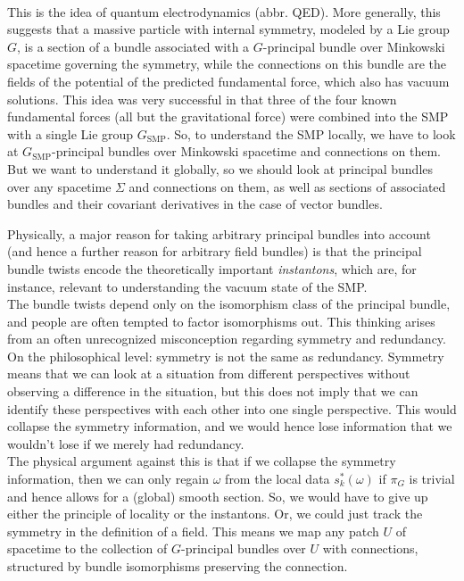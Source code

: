 \begin{enumerate}
\begin{enumerate}
\\
This is the idea of quantum electrodynamics (abbr. QED).
More generally, this suggests that a massive particle with internal symmetry, modeled by a Lie group $G$, is a section of a bundle associated with a $G$-principal bundle over Minkowski spacetime governing the symmetry, while the connections on this bundle are the fields of the potential of the predicted fundamental force, which also has vacuum solutions.
This idea was very successful in that three of the four known fundamental forces (all but the gravitational force) were combined into the SMP with a single Lie group $G_{\textrm{SMP}}$.
So, to understand the SMP locally, we have to look at $G_{\textrm{SMP}}$-principal bundles over Minkowski spacetime and connections on them.
But we want to understand it globally, so we should look at principal bundles over any spacetime $\Sigma$ and connections on them, as well as sections of associated bundles and their covariant derivatives in the case of vector bundles.
\end{enumerate}
Physically, a major reason for taking arbitrary principal bundles into account (and hence a further reason for arbitrary field bundles) is that the principal bundle twists encode the theoretically important \textit{instantons}, which are, for instance, relevant to understanding the vacuum state of the SMP.
\\
The bundle twists depend only on the isomorphism class of the principal bundle, and people are often tempted to factor isomorphisms out.
This thinking arises from an often unrecognized misconception regarding symmetry and redundancy.
On the philosophical level: symmetry is not the same as redundancy.
Symmetry means that we can look at a situation from different perspectives without observing a difference in the situation, but this does not imply that we can identify these perspectives with each other into one single perspective.
This would collapse the symmetry information, and we would hence lose information that we wouldn't lose if we merely had redundancy.
\\
The physical argument against this is that if we collapse the symmetry information, then we can only regain $\omega$ from the local data $s_{k}^{\ast}(\omega)$ if $\pi_{G}$ is trivial and hence allows for a (global) smooth section.
So, we would have to give up either the principle of locality or the instantons.
Or, we could just track the symmetry in the definition of a field.
This means we map any patch $U$ of spacetime to the collection of $G$-principal bundles over $U$ with connections, structured by bundle isomorphisms preserving the connection.

\end{enumerate}
